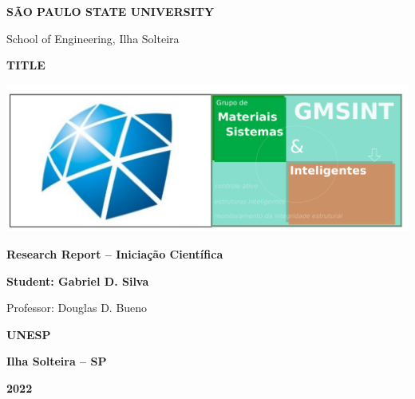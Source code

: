 \begin{titlepage}
    \begin{center}
     {\LARGE \bfseries SÃO PAULO STATE UNIVERSITY}
     
     {\LARGE School of Engineering, Ilha Solteira}
     
     \vfill
     
     {\Huge \bfseries TITLE}
     
     \vfill
     
     \includegraphics[width=\textwidth]{figures/logos/gmsint_logo.pdf}
     
     \vfill
     
     \begin{minipage}{0.7\textwidth}
      {\large \bfseries Research Report -- Iniciação Científica}
      
      {\large \bfseries Student: Gabriel D. Silva}
      
      {\large Professor: Douglas D. Bueno}
      
     \end{minipage}
     
     \vfill
     
     {\large \bfseries UNESP}
     
     {\large \bfseries Ilha Solteira -- SP}
     
     {\large \bfseries 2022}
    \end{center}
   \end{titlepage}